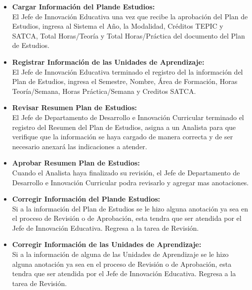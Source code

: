 \begin{itemize}
    \item \textbf{Cargar Información del Plande Estudios:}\\
    El Jefe de Innovación Educativa una vez que recibe la aprobación del Plan de Estudios, ingresa al Sistema el Año, la Modalidad, Créditos TEPIC y SATCA, Total Horas/Teoría y Total Horas/Práctica del documento del Plan de Estudios.
    \item \textbf{Registrar Información de las Unidades de Aprendizaje:}\\
    El Jefe de Innovación Educativa terminado el registro del la información del Plan de Estudios, ingresa el Semestre, Nombre, Área de Formación, Horas Teoría/Semana, Horas Práctica/Semana y Creditos SATCA.
    \item \textbf{Revisar Resumen Plan de Estudios:}\\
    El Jefe de Departamento de Desarrollo e Innovación Curricular terminado el registro del Resumen del Plan de Estudios, asigna a un Analista para que verifique que la información se haya cargado de manera correcta y de ser necesario anexará las indicaciones a atender.
    \item \textbf{Aprobar Resumen Plan de Estudios:}\\
    Cuando el Analista haya finalizado su revisión, el Jefe de Departamento de Desarrollo e Innovación Curricular podra revisarlo y agregar mas anotaciones.
    \item \textbf{Corregir Información del Plande Estudios:}\\
    Si a la información del Plan de Estudios se le hizo alguna anotación ya sea en el proceso de Revisión o de Aprobación, esta tendra que ser atendida por el Jefe de Innovación Educativa. Regresa a la tarea de Revisión.
    \item \textbf{Corregir Información de las Unidades de Aprendizaje:}\\
    Si a la información de alguna de las Unidades de Aprendizaje se le hizo alguna anotación ya sea en el proceso de Revisión o de Aprobación, esta tendra que ser atendida por el Jefe de Innovación Educativa. Regresa a la tarea de Revisión.
\end{itemize}